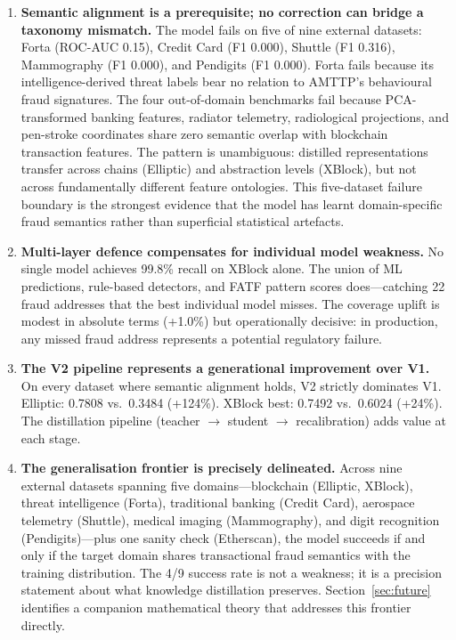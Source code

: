 \documentclass[journal]{IEEEtran}
\begin{document}
\begin{enumerate}
  \item \textbf{Semantic alignment is a prerequisite; no correction can bridge a taxonomy mismatch.} The model fails on five of nine external datasets: Forta (ROC-AUC 0.15), Credit Card (F1 0.000), Shuttle (F1 0.316), Mammography (F1 0.000), and Pendigits (F1 0.000). Forta fails because its intelligence-derived threat labels bear no relation to AMTTP's behavioural fraud signatures. The four out-of-domain benchmarks fail because PCA-transformed banking features, radiator telemetry, radiological projections, and pen-stroke coordinates share zero semantic overlap with blockchain transaction features. The pattern is unambiguous: distilled representations transfer across chains (Elliptic) and abstraction levels (XBlock), but not across fundamentally different feature ontologies. This five-dataset failure boundary is the strongest evidence that the model has learnt domain-specific fraud semantics rather than superficial statistical artefacts.

  \item \textbf{Multi-layer defence compensates for individual model weakness.} No single model achieves 99.8\% recall on XBlock alone. The union of ML predictions, rule-based detectors, and FATF pattern scores does---catching 22 fraud addresses that the best individual model misses. The coverage uplift is modest in absolute terms (+1.0\%) but operationally decisive: in production, any missed fraud address represents a potential regulatory failure.

  \item \textbf{The V2 pipeline represents a generational improvement over V1.} On every dataset where semantic alignment holds, V2 strictly dominates V1. Elliptic: 0.7808 vs.\ 0.3484 (+124\%). XBlock best: 0.7492 vs.\ 0.6024 (+24\%). The distillation pipeline (teacher $\to$ student $\to$ recalibration) adds value at each stage.

  \item \textbf{The generalisation frontier is precisely delineated.} Across nine external datasets spanning five domains---blockchain (Elliptic, XBlock), threat intelligence (Forta), traditional banking (Credit Card), aerospace telemetry (Shuttle), medical imaging (Mammography), and digit recognition (Pendigits)---plus one sanity check (Etherscan), the model succeeds if and only if the target domain shares transactional fraud semantics with the training distribution. The 4/9 success rate is not a weakness; it is a precision statement about what knowledge distillation preserves. Section~\ref{sec:future} identifies a companion mathematical theory that addresses this frontier directly.
\end{enumerate}
\end{document}

